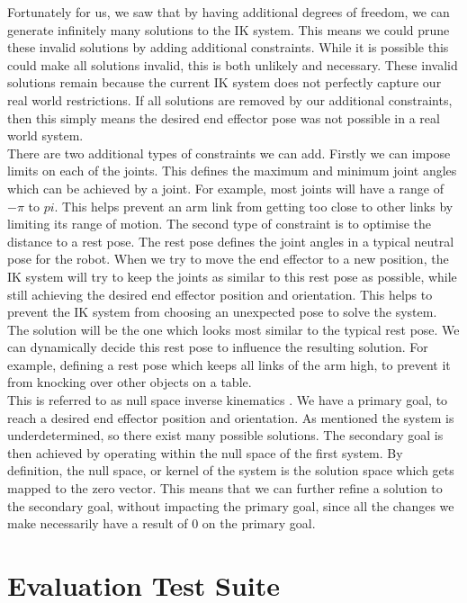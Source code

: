 Fortunately for us, we saw that by having additional degrees of freedom, we can generate infinitely many solutions to the IK system. This means we could prune these invalid solutions by adding additional constraints. While it is possible this could make all solutions invalid, this is both unlikely and necessary. These invalid solutions remain because the current IK system does not perfectly capture our real world restrictions. If all solutions are removed by our additional constraints, then this simply means the desired end effector pose was not possible in a real world system.\\

There are two additional types of constraints we can add. Firstly we can impose limits on each of the joints. This defines the maximum and minimum joint angles which can be achieved by a joint. For example, most joints will have a range of $-\pi$ to $pi$. This helps prevent an arm link from getting too close to other links by limiting its range of motion. The second type of constraint is to optimise the distance to a rest pose. The rest pose defines the joint angles in a typical neutral pose for the robot. When we try to move the end effector to a new position, the IK system will try to keep the joints as similar to this rest pose as possible, while still achieving the desired end effector position and orientation. This helps to prevent the IK system from choosing an unexpected pose to solve the system. The solution will be the one which looks most similar to the typical rest pose. We can dynamically decide this rest pose to influence the resulting solution. For example, defining a rest pose which keeps all links of the arm high, to prevent it from knocking over other objects on a table.\\

This is referred to as null space inverse kinematics \cite{null-space}. We have a primary goal, to reach a desired end effector position and orientation. As mentioned the system is underdetermined, so there exist many possible solutions. The secondary goal is then achieved by operating within the null space of the first system. By definition, the null space, or kernel of the system is the solution space which gets mapped to the zero vector. This means that we can further refine a solution to the secondary goal, without impacting the primary goal, since all the changes we make necessarily have a result of 0 on the primary goal.


\chapter{Evaluation Test Suite}
\label{apx:test-suite}

